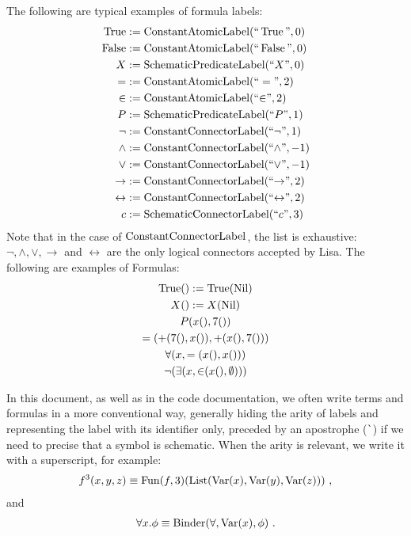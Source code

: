 \begin{example}[Formula]The following are typical examples of formula labels:
  \begin{align*}
    \operatorname{True}           & := \operatorname{ConstantAtomicLabel}(``\operatorname{True}", 0)             \\
    \operatorname{False}          & := \operatorname{ConstantAtomicLabel}(``\operatorname{False}", 0)            \\
    X               & := \operatorname{SchematicPredicateLabel}(``X", 0)                \\
    =               & := \operatorname{ConstantAtomicLabel}(``=", 2)                 \\
    {\in}           & := \operatorname{ConstantAtomicLabel}(``{\in}", 2)             \\
    P               & := \operatorname{SchematicPredicateLabel}(``P", 1)                \\
    \neg            & := \operatorname{ConstantConnectorLabel}(``{\neg}", 1)            \\
    \land           & := \operatorname{ConstantConnectorLabel}(``{\land}", -1)          \\
    \lor            & := \operatorname{ConstantConnectorLabel}(``{\lor}", -1)           \\
    \rightarrow     & := \operatorname{ConstantConnectorLabel}(``{\rightarrow}", 2)     \\
    \leftrightarrow & := \operatorname{ConstantConnectorLabel}(``{\leftrightarrow}", 2) \\
    c               & := \operatorname{SchematicConnectorLabel}(``{c}", 3)              \\
  \end{align*}
  Note that in the case of $\operatorname{ConstantConnectorLabel}$, the list is exhaustive: $\neg, \land, \lor, \rightarrow$ and $\leftrightarrow$ are the only logical connectors accepted by Lisa.
  The following are examples of Formulas:
  \begin{gather*}
    \operatorname{True}() := \operatorname{True}(\operatorname{Nil})\\
    X() := X(\operatorname{Nil})\\
    P(x(), 7()) \\
    =(+(7(), x()), +(x(), 7()))\\
    \forall(x, =(x(), x())) \\
    \neg(\exists(x, {\in}(x(), \emptyset)))
  \end{gather*}
\end{example}

In this document, as well as in the code documentation, we often write terms and formulas in a more conventional way, generally hiding the arity of labels and representing the label with its identifier only, preceded by an apostrophe (\lstinline|`|) if we need to precise that a symbol is schematic. When the arity is relevant, we write it with a superscript, for example:
%
\begin{gather*}
  f^3(x,y,z) \equiv \operatorname{Fun}(f, 3)(\operatorname{List}(\operatorname{Var}(x), \operatorname{Var}(y), \operatorname{Var}(z)))~,
\end{gather*}
%
and
%
\begin{gather*}
  \forall x. \phi \equiv \operatorname{Binder}(\forall, \operatorname{Var}(x), \phi)~.
\end{gather*}

